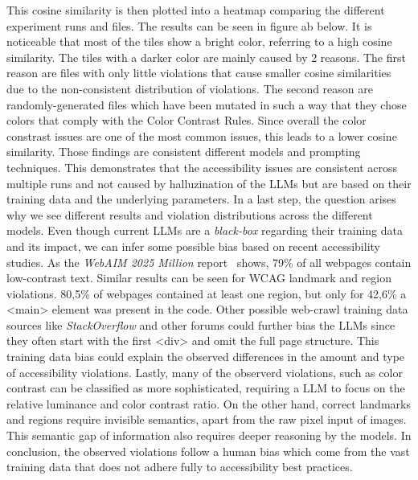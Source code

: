 This cosine similarity is then plotted into a heatmap comparing the different 
experiment runs and files. The results can be seen in figure ab below. It 
is noticeable that most of the tiles show a bright color, referring to a 
high cosine similarity. The tiles with a darker color are mainly caused 
by 2 reasons. The first reason are files with only little violations 
that cause smaller cosine similarities due to the non-consistent 
distribution of violations. The second reason are randomly-generated 
files which have been mutated in such a way that they chose colors that 
comply with the Color Contrast Rules. Since overall the color constrast 
issues are one of the most common issues, this leads to a lower cosine 
similarity.\newline
Those findings are consistent different models and 
prompting techniques. This demonstrates that the accessibility issues are 
consistent across multiple runs and not caused by halluzination of the 
LLMs but are based on their training data and the underlying parameters.\newline
In a last step, the question arises why we see different results and 
violation distributions across the different models. Even though current 
LLMs are a \textit{black-box} regarding their training data and its impact, 
we can infer some possible bias based on recent accessibility studies. As 
the \textit{WebAIM 2025 Million} report~\parencite{webaim2025million} shows, 
79\% of all webpages contain low-contrast text. Similar results can be seen 
for WCAG landmark and region violations. 80,5\% of webpages contained at 
least one region, but only for 42,6\% a <main> element was present in the 
code. Other possible web-crawl training data sources like \textit{StackOverflow} 
and other forums could further bias the LLMs since they often start with 
the first <div> and omit the full page structure. This training data bias
could explain the observed differences in the amount and type of accessibility 
violations. Lastly, many of the observerd violations, such as color contrast
can be classified as more sophisticated, requiring a LLM to focus on the 
relative luminance and color contrast ratio. On the other hand, correct 
landmarks and regions require invisible semantics, apart from the raw pixel 
input of images. This semantic gap of information also requires deeper 
reasoning by the models. In conclusion, the observed violations follow 
a human bias which come from the vast training data that does not adhere 
fully to accessibility best practices.


